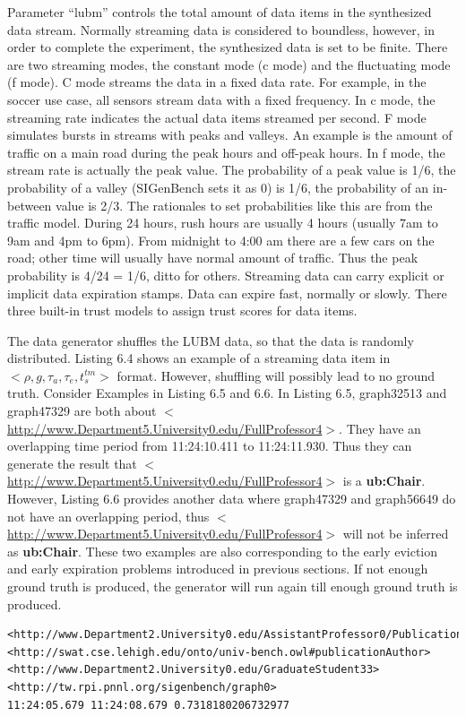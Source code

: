 Parameter ``lubm'' controls the total amount of data items in the synthesized data stream. 
Normally streaming data is considered to boundless, however, in order to complete the experiment, the synthesized data is set to be finite. 
There are two streaming modes, the constant mode (c mode) and the fluctuating mode (f mode).
C mode streams the data in a fixed data rate.
For example, in the soccer use case, all sensors stream data with a fixed frequency.
In c mode, the streaming rate indicates the actual data items streamed per second. 
F mode simulates bursts in streams with peaks and valleys. 
An example is the amount of traffic on a main road during the peak hours and off-peak hours. 
In f mode, the stream rate is actually the peak value. 
The probability of a peak value is 1/6, the probability of a valley (SIGenBench sets it as 0) is 1/6, the probability of an in-between value is 2/3. 
The rationales to set probabilities like this are from the traffic model. 
During 24 hours, rush hours are usually 4 hours (usually 7am to 9am and 4pm to 6pm).
From midnight to 4:00 am there are a few cars on the road; other time will usually have normal amount of traffic. 
Thus the peak probability is 4/24 = 1/6, ditto for others.
Streaming data can carry explicit or implicit data expiration stamps.
Data can expire fast, normally or slowly.
There three built-in trust models to assign trust scores for data items.

The data generator shuffles the LUBM data, so that the data is randomly distributed.
Listing 6.4 shows an example of a streaming data item in $<\rho, g, \tau_{a}, \tau_{e}, t^{tm}_{s}>$ format.
However, shuffling will possibly lead to no ground truth. 
Consider Examples in Listing 6.5 and 6.6. 
In Listing 6.5, graph32513 and graph47329 are both about $<$\url{http://www.Department5.University0.edu/FullProfessor4}$>$. 
They have an overlapping time period from 11:24:10.411 to 11:24:11.930.
Thus they can generate the result that $<$\url{http://www.Department5.University0.edu/FullProfessor4}$>$ is a \textbf{ub:Chair}.
However, Listing 6.6 provides another data where graph47329 and graph56649 do not have an overlapping period, thus $<$\url{http://www.Department5.University0.edu/FullProfessor4}$>$ will not be inferred as \textbf{ub:Chair}.
These two examples are also corresponding to the early eviction and early expiration problems introduced in previous sections. 
If not enough ground truth is produced, the generator will run again till enough ground truth is produced.

\begin{lstlisting}[caption={Generated RDF Stream Example 1},basicstyle=\tiny,frame=single]
<http://www.Department2.University0.edu/AssistantProfessor0/Publication7> 
<http://swat.cse.lehigh.edu/onto/univ-bench.owl#publicationAuthor>
<http://www.Department2.University0.edu/GraduateStudent33> 
<http://tw.rpi.pnnl.org/sigenbench/graph0> 
11:24:05.679 11:24:08.679 0.7318180206732977
\end{lstlisting}

